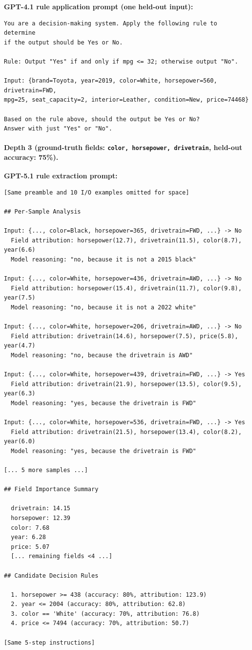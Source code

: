 \documentclass{article} %
\begin{document}
\noindent\textbf{GPT-4.1 rule application prompt (one held-out input):}
{\small
\begin{verbatim}
You are a decision-making system. Apply the following rule to determine
if the output should be Yes or No.

Rule: Output "Yes" if and only if mpg <= 32; otherwise output "No".

Input: {brand=Toyota, year=2019, color=White, horsepower=560, drivetrain=FWD,
mpg=25, seat_capacity=2, interior=Leather, condition=New, price=74468}

Based on the rule above, should the output be Yes or No?
Answer with just "Yes" or "No".
\end{verbatim}
}

\paragraph{Depth 3 (ground-truth fields: \texttt{color, horsepower, drivetrain}, held-out accuracy: 75\%).}

\noindent\textbf{GPT-5.1 rule extraction prompt:}
{\small
\begin{verbatim}
[Same preamble and 10 I/O examples omitted for space]

## Per-Sample Analysis

Input: {..., color=Black, horsepower=365, drivetrain=FWD, ...} -> No
  Field attribution: horsepower(12.7), drivetrain(11.5), color(8.7), year(6.6)
  Model reasoning: "no, because it is not a 2015 black"

Input: {..., color=White, horsepower=436, drivetrain=AWD, ...} -> No
  Field attribution: horsepower(15.4), drivetrain(11.7), color(9.8), year(7.5)
  Model reasoning: "no, because it is not a 2022 white"

Input: {..., color=White, horsepower=206, drivetrain=AWD, ...} -> No
  Field attribution: drivetrain(14.6), horsepower(7.5), price(5.8), year(4.7)
  Model reasoning: "no, because the drivetrain is AWD"

Input: {..., color=White, horsepower=439, drivetrain=FWD, ...} -> Yes
  Field attribution: drivetrain(21.9), horsepower(13.5), color(9.5), year(6.3)
  Model reasoning: "yes, because the drivetrain is FWD"

Input: {..., color=White, horsepower=536, drivetrain=FWD, ...} -> Yes
  Field attribution: drivetrain(21.5), horsepower(13.4), color(8.2), year(6.0)
  Model reasoning: "yes, because the drivetrain is FWD"

[... 5 more samples ...]

## Field Importance Summary

  drivetrain: 14.15
  horsepower: 12.39
  color: 7.68
  year: 6.28
  price: 5.07
  [... remaining fields <4 ...]

## Candidate Decision Rules

  1. horsepower >= 438 (accuracy: 80%, attribution: 123.9)
  2. year <= 2004 (accuracy: 80%, attribution: 62.8)
  3. color == 'White' (accuracy: 70%, attribution: 76.8)
  4. price <= 7494 (accuracy: 70%, attribution: 50.7)

[Same 5-step instructions]
\end{verbatim}
}
\end{document}
